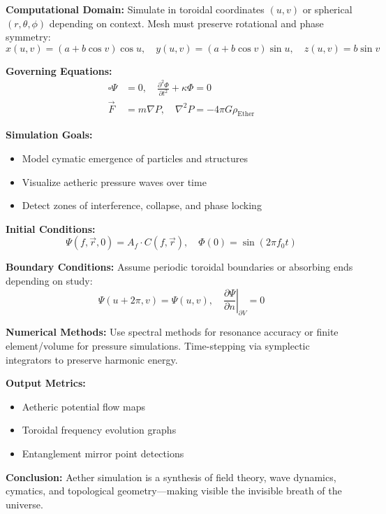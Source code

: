 \textbf{Computational Domain:}
Simulate in toroidal coordinates $(u, v)$ or spherical $(r, \theta, \phi)$ depending on context. Mesh must preserve rotational and phase symmetry:
\[
x(u, v) = (a + b \cos v) \cos u, \quad y(u, v) = (a + b \cos v) \sin u, \quad z(u, v) = b \sin v
\]

\textbf{Governing Equations:}
\[
\begin{aligned}
\square \Psi &= 0, \quad \frac{\partial^2 \Phi}{\partial t^2} + \kappa \Phi = 0 \\
\vec{F} &= m \nabla P, \quad \nabla^2 P = -4 \pi G \rho_{\text{Ether}}
\end{aligned}
\]

\textbf{Simulation Goals:}
\begin{itemize}
    \item \texttt{} Model cymatic emergence of particles and structures
    \item \texttt{} Visualize aetheric pressure waves over time
    \item \texttt{} Detect zones of interference, collapse, and phase locking
\end{itemize}

\textbf{Initial Conditions:}
\[
\Psi(f, \vec{r}, 0) = A_f \cdot C(f, \vec{r}), \quad \Phi(0) = \sin \left( 2 \pi f_0 t \right)
\]

\textbf{Boundary Conditions:}
Assume periodic toroidal boundaries or absorbing ends depending on study:
\[
\Psi(u + 2 \pi, v) = \Psi(u, v), \quad \left. \frac{\partial \Psi}{\partial n} \right|_{\partial V} = 0
\]

\textbf{Numerical Methods:}
Use spectral methods for resonance accuracy or finite element/volume for pressure simulations. Time-stepping via symplectic integrators to preserve harmonic energy.

\textbf{Output Metrics:}
\begin{itemize}
    \item \texttt{} Aetheric potential flow maps
    \item \texttt{} Toroidal frequency evolution graphs
    \item \texttt{} Entanglement mirror point detections
\end{itemize}

\textbf{Conclusion:}
Aether simulation is a synthesis of field theory, wave dynamics, cymatics, and topological geometry—making visible the invisible breath of the universe.

